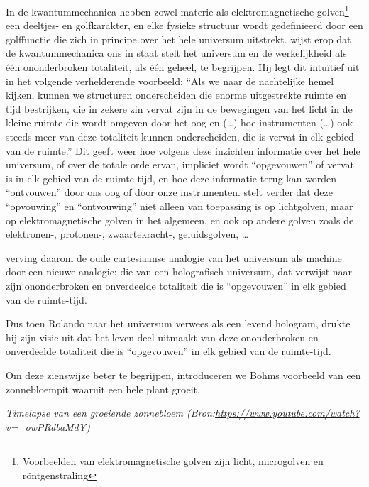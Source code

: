 \documentclass[
  11pt,
]{book}
\begin{document}
In de kwantummechanica hebben zowel materie als elektromagnetische golven\footnote{Voorbeelden van elektromagnetische golven zijn licht, microgolven en röntgenstraling} een deeltjes- en golfkarakter, en elke fysieke structuur wordt gedefinieerd door een golffunctie die zich in principe over het hele universum uitstrekt. \citet{bohm1980} wijst erop dat de kwantummechanica ons in staat stelt het universum en de werkelijkheid als één ononderbroken totaliteit, als één geheel, te begrijpen. Hij legt dit intuïtief uit in het volgende verhelderende voorbeeld: ``Als we naar de nachtelijke hemel kijken, kunnen we structuren onderscheiden die enorme uitgestrekte ruimte en tijd bestrijken, die in zekere zin vervat zijn in de bewegingen van het licht in de kleine ruimte die wordt omgeven door het oog en (\ldots) hoe instrumenten (\ldots) ook steeds meer van deze totaliteit kunnen onderscheiden, die is vervat in elk gebied van de ruimte.'' Dit geeft weer hoe volgens deze inzichten informatie over het hele universum, of over de totale orde ervan, impliciet wordt ``opgevouwen'' of vervat is in elk gebied van de ruimte-tijd, en hoe deze informatie terug kan worden ``ontvouwen'' door ons oog of door onze instrumenten. \citet{bohm1980} stelt verder dat deze ``opvouwing'' en ``ontvouwing'' niet alleen van toepassing is op lichtgolven, maar op elektromagnetische golven in het algemeen, en ook op andere golven zoals de elektronen-, protonen-, zwaartekracht-, geluidsgolven, \ldots{}

\citet{bohm1980} verving daarom de oude cartesiaanse analogie van het universum als machine door een nieuwe analogie: die van een holografisch universum, dat verwijst naar zijn ononderbroken en onverdeelde totaliteit die is ``opgevouwen'' in elk gebied van de ruimte-tijd.

Dus toen Rolando naar het universum verwees als een levend hologram, drukte hij zijn visie uit dat het leven deel uitmaakt van deze ononderbroken en onverdeelde totaliteit die is ``opgevouwen'' in elk gebied van de ruimte-tijd.

Om deze zienswijze beter te begrijpen, introduceren we Bohms voorbeeld van een zonnebloempit waaruit een hele plant groeit.

\emph{Timelapse van een groeiende zonnebloem (Bron:\url{https://www.youtube.com/watch?v=_owPRdbaMdY})}
\end{document}
